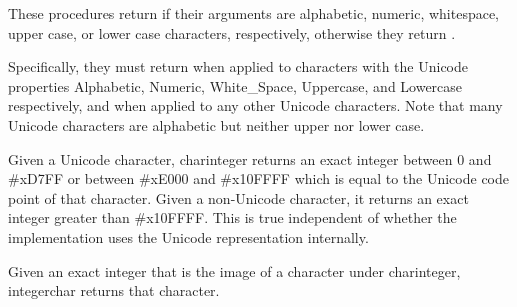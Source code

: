 \begin{entry}{%
}

These procedures return \schtrue{} if their arguments are alphabetic,
numeric, whitespace, upper case, or lower case characters, respectively,
otherwise they return \schfalse.  

Specifically, they must return \schtrue{} when applied to characters with
the Unicode properties Alphabetic, Numeric, White\_Space, Uppercase, and
Lowercase respectively, and \schfalse{} when applied to any other Unicode
characters.  Note that many Unicode characters are alphabetic but neither
upper nor lower case.

\end{entry}


%


\begin{entry}{%
}

Given a Unicode character, {\cf char\coerce{}integer} returns an
exact integer between 0 and \#xD7FF or between \#xE000 and \#x10FFFF
which is equal to the Unicode code point of that character.  Given a
non-Unicode character, it returns an exact integer greater than \#x10FFFF.
This is true independent of whether the implementation uses the Unicode
representation internally.

Given an exact integer that is the image of
a character under {\cf char\coerce{}integer}, {\cf integer\coerce{}char}
returns that character.
%
%
%
%
%
\end{entry}


